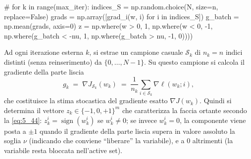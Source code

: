 \documentclass[a4paper,12pt]{article}
\numberwithin{equation}{section}
\numberwithin{figure}{section}
\numberwithin{table}{section}
\begin{document}
\begin{pythoncode}[title= Newton-L1]

#
    for k in range(max_iter):
        indices_S = np.random.choice(N, size=n, replace=False)
        grads = np.array([grad_i(w, i) for i in indices_S])
        g_batch = np.mean(grads, axis=0)
        z = np.where(w > 0, 1,
            np.where(w < 0, -1,
                np.where(g_batch < -nu, 1,
                    np.where(g_batch > nu, -1, 0))))
\end{pythoncode}
Ad ogni iterazione esterna $k$, si estrae un campione casuale $\mathcal{S}_k$ di $n_k=n$ indici distinti (senza reinserimento) da $\{0,\dots,N-1\}$. Su questo campione si calcola il gradiente della parte liscia
\[
g_k \;=\; \nabla J_{\mathcal{S}_k}(w_k) \;=\; \frac{1}{n_k}\sum_{i\in\mathcal{S}_k}\nabla\ell(w_k;i),
\]
che costituisce la stima stocastica del gradiente esatto $\nabla J(w_k)$. Quindi si determina il vettore $z_k\in\{-1,0,+1\}^m$ che caratterizza la faccia ortante secondo la \eqref{eq:5_44}: $z_k^i=\operatorname{sign}(w_k^i)$ se $w_k^i\neq 0$; se invece $w_k^i=0$, la componente viene posta a $\pm 1$ quando il gradiente della parte liscia supera in valore assoluto la soglia $\nu$ (indicando che conviene ``liberare'' la variabile), e a $0$ altrimenti (la variabile resta bloccata nell'active set).
\end{document}
